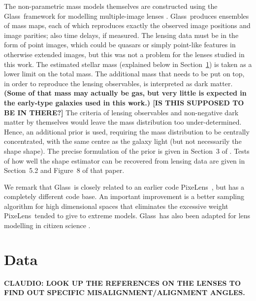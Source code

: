 \documentclass[useAMS,usenatbib]{mn2e}
\def\Glass{{\sc Glass}}
\def\PixeLens{{\sc PixeLens}}
\begin{document}
The non-parametric mass models themselves are constructed using the \Glass\ framework for modelling multiple-image lenses \citep{2014MNRAS.445.2181C}. \Glass\ produces ensembles of mass maps, each of which reproduces exactly the observed image positions and image parities; also time delays, if measured. The lensing data must be in the form of point images, which could be quasars or simply point-like features in otherwise extended images, but this was not a problem for the lenses studied in this work. The estimated stellar mass (explained below in Section~\ref{sec:data}) is taken as a lower limit on the total mass. The additional mass that needs to be put on top, in order to reproduce the lensing observables, is interpreted as dark matter. \textbf{(Some of that mass may actually be gas, but very little is expected in the early-type galaxies used in this work.) [IS THIS SUPPOSED TO BE IN THERE?]} The criteria of lensing observables and non-negative dark matter by themselves would leave the mass distribution too under-determined. Hence, an additional prior is used, requiring the mass distribution to be centrally concentrated, with the same centre as the galaxy light (but not necessarily the shape shape). The precise formulation of the prior is given in Section~3 of \cite{2014MNRAS.445.2181C}. Tests of how well the shape estimator can be recovered from lensing data are given in Section~5.2 and Figure~8 of that paper.

We remark that \Glass\ is closely related to an earlier code \PixeLens\ \citep{2004AJ....127.2604S,2008ApJ...679...17C}, but has a completely different code base. An important improvement is a better sampling algorithm for high dimensional spaces \citep{2012MNRAS.425.3077L} that eliminates the excessive weight \PixeLens\ tended to give to extreme models. \Glass\ has also been adapted for lens modelling in citizen science \citep{2015MNRAS.447.2170K}.

\section{Data}\label{sec:data}
\textbf{CLAUDIO: LOOK UP THE REFERENCES ON THE LENSES TO FIND OUT SPECIFIC MISALIGNMENT/ALIGNMENT ANGLES.}
\end{document}
